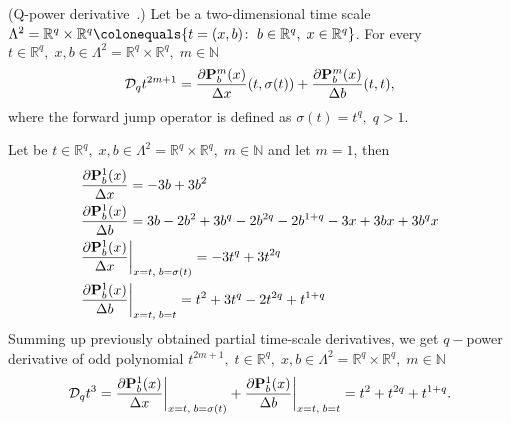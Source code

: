 \begin{cor}
    \label{q_power_derivative_case}
    (Q-power derivative~\cite{aldwoah2011power}.)
    Let be a two-dimensional time scale
    $\Lambda^2 = {\mathbb{R}}^{q} \times {\mathbb{R}}^{q} \colonequals \{t=(x,b) \colon \; b\in {\mathbb{R}}^{q}, \; x\in{\mathbb{R}}^{q} \}$.
    For every $t\in {\mathbb{R}}^{q}, \; x,b\in\Lambda^2 = {\mathbb{R}}^{q} \times {\mathbb{R}}^{q}, \; m\in\mathbb{N}$
    \[
        \mathcal{D}_q t^{2m+1}
        = \frac{\partial {\mathbf{P}}\sp{m} \sb{b}(x)}{\Delta x}(t, \sigma(t))
        + \frac{\partial {\mathbf{P}}\sp{m} \sb{b}(x)}{\Delta b}(t, t),
    \]
    where the forward jump operator is defined as $\sigma(t) = t^q, \; q > 1$.
\end{cor}
\begin{examp}
    \label{time_scale_nq_example_1}
    Let be $t\in {\mathbb{R}}^{q}, \; x,b\in\Lambda^2 = {\mathbb{R}}^{q} \times {\mathbb{R}}^{q}, \; m\in\mathbb{N}$
    and let $m=1$, then
    \begin{align*}
        &\frac{\partial {\mathbf{P}}\sp{1} \sb{b}(x)}{\Delta x} = -3 b + 3 b^2 \\
        &\frac{\partial {\mathbf{P}}\sp{1} \sb{b}(x)}{\Delta b} = 3 b - 2 b^2 + 3 b^q - 2 b^{2 q} - 2 b^{1 + q} - 3 x + 3 b x + 3 b^q x \\
        &\frac{\partial {\mathbf{P}}\sp{1} \sb{b}(x)}{\Delta x} \bigg |_{x = t, \; b = \sigma(t)} = -3 t^q + 3 t^{2 q} \\
        &\frac{\partial {\mathbf{P}}\sp{1} \sb{b}(x)}{\Delta b} \bigg |_{x = t, \; b = t} = t^2 + 3 t^q - 2 t^{2 q} + t^{1 + q}
    \end{align*}
    Summing up previously obtained partial time-scale derivatives, we get $q-$power derivative of odd polynomial
    $t^{2m+1}, \; t\in {\mathbb{R}}^{q}, \; x,b\in\Lambda^2 = {\mathbb{R}}^{q} \times {\mathbb{R}}^{q}, \; m\in\mathbb{N}$
    \[
        \mathcal{D}_q t^{3}
        = \frac{\partial {\mathbf{P}}\sp{1} \sb{b}(x)}{\Delta x} \bigg |_{x = t, \; b = \sigma(t)}
        + \frac{\partial {\mathbf{P}}\sp{1} \sb{b}(x)}{\Delta b} \bigg |_{x = t, \; b = t}
        = t^2 + t^{2 q} + t^{1 + q}.
    \]
\end{examp}
